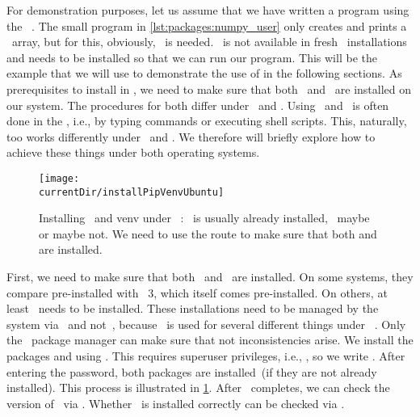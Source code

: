 %
%
%
%
%
%
For demonstration purposes, let us assume that we have written a program using the  \numpy~\cite{HMvdWGVCWTBSKPHvKBHFdRWPGMSRWAGO2020APWN,DBvR2024ITN,J2018NPSCADSAWNSAM}.
The small program in \cref{lst:packages:numpy_user} only creates and prints a \numpy\ array, but for this, obviously, \numpy\ is needed.
\numpy\ is not available in fresh \python\ installations and needs to be installed so that we can run our program.
This will be the example that we will use to demonstrate the use of  in the following sections.%
%
%
%
%
As prerequisites to install  in , we need to make sure that both \pip\ and \venv\ are installed on our system.
The procedures for both differ under \linux\ and \windows.
Using \pip\ and \venv\ is often done in the , i.e., by typing commands or executing shell scripts.
This, naturally, too works differently under \linux\ and \windows.
We therefore will briefly explore how to achieve these things under both operating systems.%
%
%
%
\begin{figure}%
\centering%
\texttt{[image: \\currentDir/installPipVenvUbuntu]}%
\caption{Installing \pip\ and venv under \ubuntu\ \linux: \pip~is usually already installed, \venv\ maybe or maybe not. %
We need to use the  route to make sure that both  and  are installed.}%
\label{fig:installPipVenvUbuntu}%
\end{figure}%
%
First, we need to make sure that both \pip\ and \venv\ are installed.
On some systems, they compare pre-installed with \python~3, which itself comes pre-installed.
On others, at least \venv\ needs to be installed.
These installations need to be managed by the system via \aptGet\ and not~\pip, because \python\ is used for several different things under \ubuntu\ \linux.
Only the \linux\ package manager can make sure that not inconsistencies arise.
We install the packages  and  using \aptGet.
This requires superuser privileges, i.e., , so we write .
After entering the password, both packages are installed~(if they are not already installed).
This process is illustrated in \cref{fig:installPipVenvUbuntu}.
After \aptGet\ completes, we can check the version of \pip\ via .
Whether \venv\ is installed correctly can be checked via .

